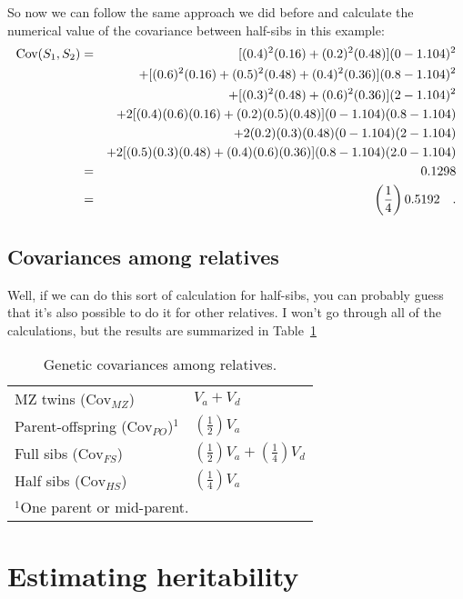 \documentclass[12pt]{article}
\newcommand{\Cov}{\mbox{Cov}}
\begin{document}
So now we can follow the same approach we did before and calculate the
numerical value of the covariance between half-sibs in this example:
\begin{eqnarray*}
\Cov(S_1,S_2) &=&\ [(0.4)^2(0.16) + (0.2)^2(0.48)](0 - 1.104)^2 \\
          && + [(0.6)^2(0.16) + (0.5)^2(0.48) + (0.4)^2(0.36)] (0.8 - 1.104)^2 \\
          && + [(0.3)^2(0.48) + (0.6)^2(0.36)](2 - 1.104)^2 \\
          && + 2[(0.4)(0.6)(0.16) + (0.2)(0.5)(0.48)](0 - 1.104)(0.8 - 1.104) \\
          && + 2(0.2)(0.3)(0.48)(0 - 1.104)(2 - 1.104) \\
          && + 2[(0.5)(0.3)(0.48) + (0.4)(0.6)(0.36)](0.8 - 1.104)(2.0 - 1.104) \\
         &=&\ 0.1298 \\
         &=&\ \left({1 \over 4}\right)0.5192 \quad .
\end{eqnarray*}

\subsection*{Covariances among relatives}

Well, if we can do this sort of calculation for half-sibs, you can
probably guess that it's also possible to do it for other relatives. I
won't go through all of the calculations, but the results are
summarized in Table~\ref{table:relatives}

\begin{table}
\begin{center}
\begin{tabular}{ll}
\hline\hline
MZ twins ($\Cov_{MZ}$) & $V_a + V_d$ \\
Parent-offspring ($\Cov_{PO}$)$^1$ & $\left(\frac{1}{2}\right)V_a$ \\
Full sibs ($\Cov_{FS}$) & $\left(\frac{1}{2}\right)V_a +
\left(\frac{1}{4}\right)V_d$ \\
Half sibs ($\Cov_{HS}$) & $\left(\frac{1}{4}\right)V_a$ \\
\hline
\multicolumn{2}{l}{$^1$One parent or mid-parent.}
\end{tabular}
\end{center}
\caption{Genetic covariances among relatives.}\label{table:relatives}
\end{table}

\section*{Estimating heritability}
\end{document}
